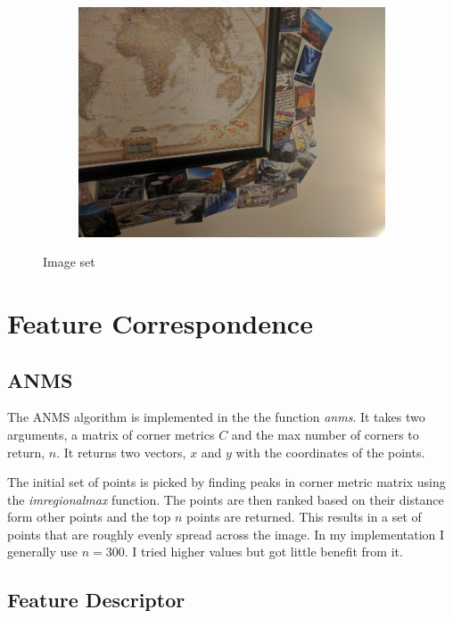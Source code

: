 \documentclass[12pt]{article}
\begin{document}
\begin{figure}[t!]
\begin{subfigure}[t]{0.3\textwidth}
        \includegraphics[width=\linewidth]{../Images/CustomSet1/3}
    \end{subfigure}

    \caption{Image set}
    \label{fig_set1}
\end{figure}


\section{Feature Correspondence} %

\subsection{ANMS}

The ANMS algorithm is implemented in the the function \textit{anms}. It takes two arguments, a matrix of corner metrics $C$ and the max number of corners to return, $n$. It returns two vectors, $x$ and $y$ with the coordinates of the points.

The initial set of points is picked by finding peaks in corner metric matrix using the \textit{imregionalmax} function. The points are then ranked based on their distance form other points and the top $n$ points are returned. This results in a set of points that are roughly evenly spread across the image. In my implementation I generally use $n = 300$. I tried higher values but got little benefit from it. 

\subsection{Feature Descriptor}
\end{document}
